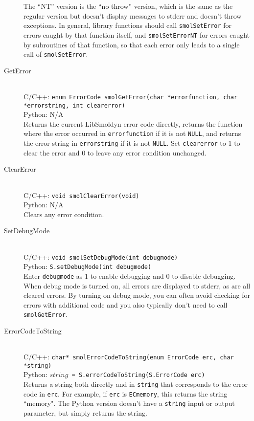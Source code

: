 \documentclass {scrbook}
\newcommand {\ttt} {\texttt}
\begin{document}
\begin{description}
The ``NT'' version is the ``no throw'' version, which is the same as the regular version but doesn't display messages to stderr and doesn't throw exceptions. In general, library functions should call \ttt{smolSetError} for errors caught by that function itself, and \ttt{smolSetErrorNT} for errors caught by subroutines of that function, so that each error only leads to a single call of \ttt{smolSetError}.

\item[GetError]
\hfill \\
C/C++: \ttt{enum ErrorCode smolGetError(char *errorfunction, char *errorstring, int clearerror)}\\
Python: N/A\\
Returns the current LibSmoldyn error code directly, returns the function where the error occurred in \ttt{errorfunction} if it is not \ttt{NULL}, and returns the error string in \ttt{errorstring} if it is not \ttt{NULL}. Set \ttt{clearerror} to 1 to clear the error and 0 to leave any error condition unchanged.

\item[ClearError]
\hfill \\
C/C++: \ttt{void smolClearError(void)}\\
Python: N/A\\
Clears any error condition.

\item[SetDebugMode]
\hfill \\
C/C++: \ttt{void smolSetDebugMode(int debugmode)}\\
Python: \ttt{S.setDebugMode(int debugmode)}\\
Enter \ttt{debugmode} as 1 to enable debugging and 0 to disable debugging. When debug mode is turned on, all errors are displayed to stderr, as are all cleared errors. By turning on debug mode, you can often avoid checking for errors with additional code and you also typically don't need to call \ttt{smolGetError}.

\item[ErrorCodeToString]
\hfill \\
C/C++: \ttt{char* smolErrorCodeToString(enum ErrorCode erc, char *string)}\\
Python: $string$\ttt{ = S.errorCodeToString(S.ErrorCode erc)}\\
Returns a string both directly and in \ttt{string} that corresponds to the error code in \ttt{erc}. For example, if \ttt{erc} is \ttt{ECmemory}, this returns the string ``memory". The Python version doesn't have a \ttt{string} input or output parameter, but simply returns the string.

\end{description}
\end{document}
